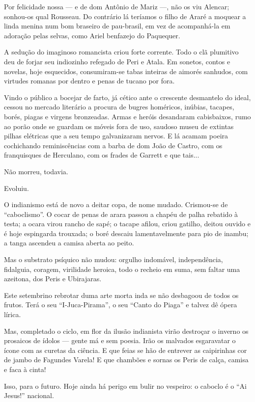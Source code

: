 Por felicidade nossa --- e de dom Antônio de Mariz ---, não os viu
Alencar; sonhou-os qual Rousseau. Do contrário lá teríamos o filho de
Araré a moquear a linda menina num bom braseiro de pau-brasil, em vez de
acompanhá-la em adoração pelas selvas, como Ariel benfazejo do
Paquequer.

A sedução do imaginoso romancista criou forte corrente. Todo o clã
plumitivo deu de forjar seu indiozinho refegado de Peri e Atala. Em
sonetos, contos e novelas, hoje esquecidos, consumiram-se tabas inteiras
de aimorés sanhudos, com virtudes romanas por dentro e penas de tucano
por fora.

Vindo o público a bocejar de farto, já cético ante o crescente
desmantelo do ideal, cessou no mercado literário a procura de bugres
homéricos, inúbias, tacapes, borés, piagas e virgens bronzeadas. Armas e
heróis desandaram cabisbaixos, rumo ao porão onde se guardam os móveis
fora de uso, saudoso museu de extintas pilhas elétricas que a seu tempo
galvanizaram nervos. E lá acamam poeira cochichando reminiscências com a
barba de dom João de Castro, com os franquisques de Herculano, com os
frades de Garrett e que tais...

Não morreu, todavia.

Evoluiu.

O indianismo está de novo a deitar copa, de nome mudado. Crismou-se de
``caboclismo''. O cocar de penas de arara passou a chapéu de palha
rebatido à testa; a ocara virou rancho de sapé; o tacape afilou, criou
gatilho, deitou ouvido e é hoje espingarda trouxada; o boré descaiu
lamentavelmente para pio de inambu; a tanga ascendeu a camisa aberta ao
peito.

Mas o substrato psíquico não mudou: orgulho indomável, independência,
fidalguia, coragem, virilidade heroica, todo o recheio em suma, sem
faltar uma azeitona, dos Peris e Ubirajaras.

Este setembrino rebrotar duma arte morta inda se não desbagoou de todos
os frutos. Terá o seu ``I-Juca-Pirama'', o seu ``Canto do Piaga'' e
talvez dê ópera lírica.

Mas, completado o ciclo, em flor da ilusão indianista virão destroçar o
inverno os prosaicos de ídolos --- gente má e sem poesia. Irão os
malvados esgaravatar o ícone com as curetas da ciência. E que feias se
hão de entrever as caipirinhas cor de jambo de Fagundes Varela! E que
chambões e sornas os Peris de calça, camisa e faca à cinta!

Isso, para o futuro. Hoje ainda há perigo em bulir no vespeiro: o
caboclo é o ``Ai Jesus!'' nacional.

